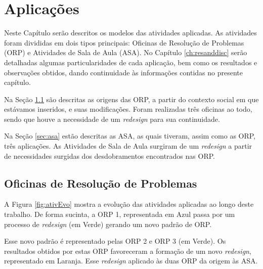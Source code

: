 \chapter{Aplicações}\label{ch:apl}

Neste Capítulo serão descritos os modelos das atividades aplicadas. As atividades foram divididas em dois tipos principais: Oficinas de Resolução de Problemas (ORP) e Atividades de Sala de Aula (ASA). No Capítulo \ref{ch:resanddisc} serão detalhadas algumas particularidades de cada aplicação, bem como os resultados e observações obtidos, dando continuidade às informações contidas no presente capítulo.

Na Seção \ref{sec:orp} são descritas as origens das ORP, a partir do contexto social em que estávamos inseridos, e suas modificações. Foram realizadas três oficinas ao todo, sendo que houve a necessidade de um \textit{redesign} para sua continuidade.

Na Seção \ref{sec:asa} estão descritas as ASA, as quais tiveram, assim como as ORP, três aplicações. As Atividades de Sala de Aula surgiram de um \textit{redesign} a partir de necessidades surgidas dos desdobramentos encontrados nas ORP.

\section{Oficinas de Resolução de Problemas} \label{sec:orp}

A Figura \ref{fig:ativEvo} mostra a evolução das atividades aplicadas ao longo deste trabalho. De forma sucinta, a ORP 1, representada em Azul passa por um processo de \textit{redesign} (em Verde) gerando um novo padrão de ORP. 

Esse novo padrão é representado pelas ORP 2 e ORP 3 (em Verde). Os resultados obtidos por estas ORP favoreceram a formação de um novo \textit{redesign}, representado em Laranja. Esse \textit{redesign} aplicado às duas ORP da origem às ASA.

